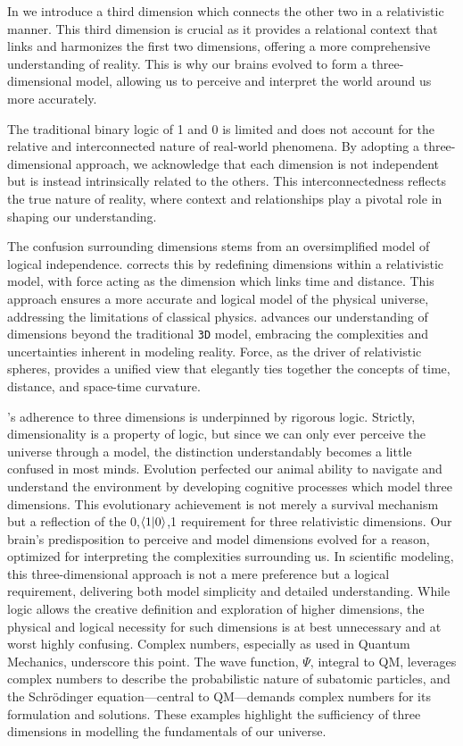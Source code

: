 \documentclass[12pt]{article}
\begin{document}
In \iR{} we introduce a third dimension which connects the other two in a relativistic manner. This third dimension is crucial as it provides a relational context that links and harmonizes the first two dimensions, offering a more comprehensive understanding of reality. This is why our brains evolved to form a three-dimensional model, allowing us to perceive and interpret the world around us more accurately.

The traditional binary logic of 1 and 0 is limited and does not account for the relative and interconnected nature of real-world phenomena. By adopting a three-dimensional approach, we acknowledge that each dimension is not independent but is instead intrinsically related to the others. This interconnectedness reflects the true nature of reality, where context and relationships play a pivotal role in shaping our understanding.

The confusion surrounding dimensions stems from an oversimplified model of logical independence. \iR{} corrects this by redefining dimensions within a relativistic model, with force acting as the dimension which links time and distance. This approach ensures a more accurate and logical model of the physical universe, addressing the limitations of classical physics. \iR{} advances our understanding of dimensions beyond the traditional \texttt{3D} model, embracing the complexities and uncertainties inherent in modeling reality. Force, as the driver of relativistic spheres, provides a unified view that elegantly ties together the concepts of time, distance, and space-time curvature.

\iR{}'s adherence to three dimensions is underpinned by rigorous logic. Strictly, dimensionality is a property of logic, but since we can only ever perceive the universe through a model, the distinction understandably becomes a little confused in most minds. Evolution perfected our animal ability to navigate and understand the environment by developing cognitive processes which model three dimensions. This evolutionary achievement is not merely a survival mechanism but a reflection of the {0,\(\langle 1 | 0 \rangle\),1} requirement for three relativistic dimensions. Our brain's predisposition to perceive and model dimensions evolved for a reason, optimized for interpreting the complexities surrounding us. In scientific modeling, this three-dimensional approach is not a mere preference but a logical requirement, delivering both model simplicity and detailed understanding. While logic allows the creative definition and exploration of higher dimensions, the physical and logical necessity for such dimensions is at best unnecessary and at worst highly confusing. Complex numbers, especially as used in Quantum Mechanics, underscore this point. The wave function, \(\Psi\), integral to QM, leverages complex numbers to describe the probabilistic nature of subatomic particles, and the Schrödinger equation—central to QM—demands complex numbers for its formulation and solutions. These examples highlight the sufficiency of three dimensions in modelling the fundamentals of our universe.
\end{document}
